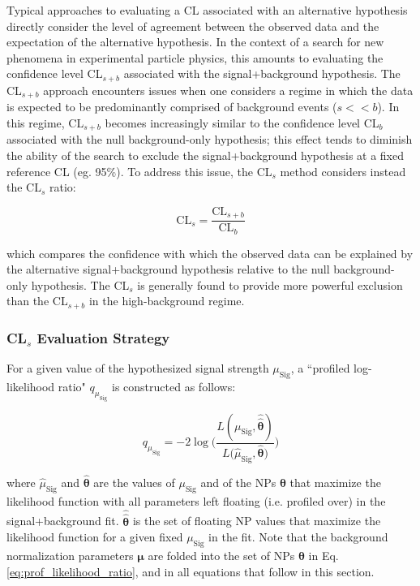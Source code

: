 Typical approaches to evaluating a CL associated with an alternative hypothesis directly consider the level of agreement between the observed data and the expectation of the alternative hypothesis. In the context of a search for new phenomena in experimental particle physics, this amounts to evaluating the confidence level CL\(_{s+b}\) associated with the signal+background hypothesis. The CL\(_{s+b}\) approach encounters issues when one considers a regime in which the data is expected to be predominantly comprised of background events (\(s<<b\)). In this regime, CL\(_{s+b}\) becomes increasingly similar to the confidence level CL\(_{b}\) associated with the null background-only hypothesis; this effect tends to diminish the ability of the search to exclude the signal+background hypothesis at a fixed reference CL (eg. 95\%). To address this issue, the CL\(_s\) method considers instead the CL\(_s\) ratio:

\begin{equation}
\label{eq:CLs_method}
\text{CL}_s = \frac{\text{CL}_{s+b}}{\text{CL}_{b}}
\end{equation}

\noindent which compares the confidence with which the observed data can be explained by the alternative signal+background hypothesis relative to the null background-only hypothesis. The CL\(_s\) is generally found to provide more powerful exclusion than the CL\(_{s+b}\) in the high-background regime.

\subsubsection{CL\(_s\) Evaluation Strategy}

For a given value of the hypothesized signal strength \(\mu_\text{Sig}\), a ``profiled log-likelihood ratio" \(q_{\mu_\text{Sig}}\) is constructed as follows:

\begin{equation}
\label{eq:prof_likelihood_ratio}
q_{\mu_\text{Sig}} = -2\log\Bigg( \frac{L(\mu_\text{Sig}, \boldsymbol{\hat{\hat{\theta}}})}{L(\hat{\mu}_\text{Sig}, \boldsymbol{\hat{\theta})}} \Bigg)
\end{equation}

\noindent where \(\hat{\mu}_\text{Sig}\) and \(\boldsymbol{\hat{\theta}}\) are the values of \(\mu_\text{Sig}\) and of the NPs \(\boldsymbol{\theta}\) that maximize the likelihood function with all parameters left floating (i.e. profiled over) in the signal+background fit. \(\boldsymbol{\hat{\hat{\theta}}}\) is the set of floating NP values that maximize the likelihood function for a given fixed \(\mu_\text{Sig}\) in the fit. Note that the background normalization parameters \(\boldsymbol{\mu}\) are folded into the set of NPs \(\boldsymbol{\theta}\) in Eq. 
\ref{eq:prof_likelihood_ratio}, and in all equations that follow in this section.

